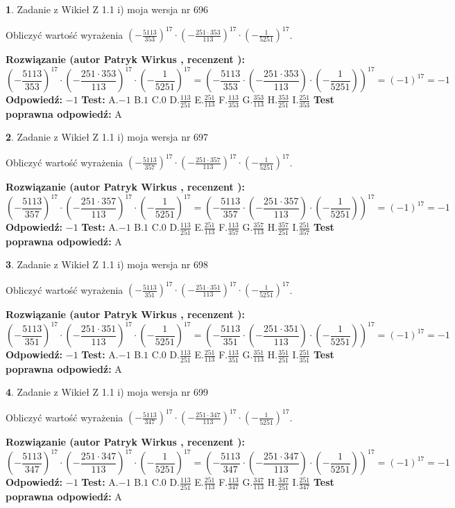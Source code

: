 \documentclass[12pt, a4paper]{article}
\theoremstyle{definition} %
\newtheorem{zad}{}
\newcommand{\zadStart}[1]{\begin{zad}#1\newline}
\newcommand{\zadStop}{\end{zad}}
\newcommand{\rozwStart}[2]{\noindent \textbf{Rozwiązanie (autor #1 , recenzent #2): }\newline}
\newcommand{\rozwStop}{\newline}
\newcommand{\odpStart}{\noindent \textbf{Odpowiedź:}\newline}
\newcommand{\odpStop}{\newline}
\newcommand{\testStart}{\noindent \textbf{Test:}\newline}
\newcommand{\testStop}{\newline}
\newcommand{\kluczStart}{\noindent \textbf{Test poprawna odpowiedź:}\newline}
\newcommand{\kluczStop}{\newline}
\begin{document}
\zadStart{Zadanie z Wikieł Z 1.1 i) moja wersja nr 696}

Obliczyć wartość wyrażenia $(-\frac{5113}{353})^{17} \cdot (-\frac{251 \cdot 353}{113})^{17} \cdot (-\frac{1}{5251})^{17}$.
\zadStop
\rozwStart{Patryk Wirkus}{}
$$(-\frac{5113}{353})^{17} \cdot (-\frac{251 \cdot 353}{113})^{17} \cdot (-\frac{1}{5251})^{17} = (-\frac{5113}{353} \cdot (-\frac{251 \cdot 353}{113}) \cdot (-\frac{1}{5251}))^{17} = (-1)^{17} = -1$$
\rozwStop
\odpStart
$-1$
\odpStop
\testStart
A.$-1$ B.$1$ C.$0$ D.$\frac{113}{251}$ E.$\frac{251}{113}$
F.$\frac{113}{353}$ G.$\frac{353}{113}$
H.$\frac{353}{251}$
I.$\frac{251}{353}$
\testStop
\kluczStart
A
\kluczStop



\zadStart{Zadanie z Wikieł Z 1.1 i) moja wersja nr 697}

Obliczyć wartość wyrażenia $(-\frac{5113}{357})^{17} \cdot (-\frac{251 \cdot 357}{113})^{17} \cdot (-\frac{1}{5251})^{17}$.
\zadStop
\rozwStart{Patryk Wirkus}{}
$$(-\frac{5113}{357})^{17} \cdot (-\frac{251 \cdot 357}{113})^{17} \cdot (-\frac{1}{5251})^{17} = (-\frac{5113}{357} \cdot (-\frac{251 \cdot 357}{113}) \cdot (-\frac{1}{5251}))^{17} = (-1)^{17} = -1$$
\rozwStop
\odpStart
$-1$
\odpStop
\testStart
A.$-1$ B.$1$ C.$0$ D.$\frac{113}{251}$ E.$\frac{251}{113}$
F.$\frac{113}{357}$ G.$\frac{357}{113}$
H.$\frac{357}{251}$
I.$\frac{251}{357}$
\testStop
\kluczStart
A
\kluczStop



\zadStart{Zadanie z Wikieł Z 1.1 i) moja wersja nr 698}

Obliczyć wartość wyrażenia $(-\frac{5113}{351})^{17} \cdot (-\frac{251 \cdot 351}{113})^{17} \cdot (-\frac{1}{5251})^{17}$.
\zadStop
\rozwStart{Patryk Wirkus}{}
$$(-\frac{5113}{351})^{17} \cdot (-\frac{251 \cdot 351}{113})^{17} \cdot (-\frac{1}{5251})^{17} = (-\frac{5113}{351} \cdot (-\frac{251 \cdot 351}{113}) \cdot (-\frac{1}{5251}))^{17} = (-1)^{17} = -1$$
\rozwStop
\odpStart
$-1$
\odpStop
\testStart
A.$-1$ B.$1$ C.$0$ D.$\frac{113}{251}$ E.$\frac{251}{113}$
F.$\frac{113}{351}$ G.$\frac{351}{113}$
H.$\frac{351}{251}$
I.$\frac{251}{351}$
\testStop
\kluczStart
A
\kluczStop



\zadStart{Zadanie z Wikieł Z 1.1 i) moja wersja nr 699}

Obliczyć wartość wyrażenia $(-\frac{5113}{347})^{17} \cdot (-\frac{251 \cdot 347}{113})^{17} \cdot (-\frac{1}{5251})^{17}$.
\zadStop
\rozwStart{Patryk Wirkus}{}
$$(-\frac{5113}{347})^{17} \cdot (-\frac{251 \cdot 347}{113})^{17} \cdot (-\frac{1}{5251})^{17} = (-\frac{5113}{347} \cdot (-\frac{251 \cdot 347}{113}) \cdot (-\frac{1}{5251}))^{17} = (-1)^{17} = -1$$
\rozwStop
\odpStart
$-1$
\odpStop
\testStart
A.$-1$ B.$1$ C.$0$ D.$\frac{113}{251}$ E.$\frac{251}{113}$
F.$\frac{113}{347}$ G.$\frac{347}{113}$
H.$\frac{347}{251}$
I.$\frac{251}{347}$
\testStop
\kluczStart
A
\kluczStop
\end{document}
